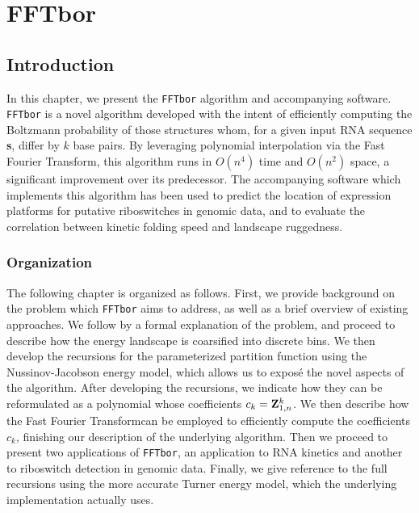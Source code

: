 
\newcommand{\FFTbor}{\mbox{\tt FFTbor}\xspace}
\newcommand{\FFT}{Fast Fourier Transform}
\newcommand{\iDFT}{inverse Discrete Fourier Transform}
\newcommand{\Z}{\mathcal{Z}}
\newcommand{\z}[3]{{\bf Z}^{#1}_{#2,#3}}
\newcommand{\seq}{{\bf s}\xspace}
\newcommand{\strS}{\ensuremath{\mathcal S}\xspace}
\newcommand{\strT}{\ensuremath{\mathcal T}\xspace}

\chapter{FFTbor}

\label{FFTbor}


\section{Introduction}

In this chapter, we present the \FFTbor algorithm and accompanying software.
\FFTbor is a novel algorithm developed with the intent of efficiently computing
the Boltzmann probability of those structures whom, for a given input RNA
sequence \seq, differ by $k$ base pairs. By leveraging polynomial interpolation
via the \FFT, this algorithm runs in $O(n^4)$ time and
$O(n^2)$ space, a significant improvement over its predecessor. The accompanying
software which implements this algorithm has been used to predict the location
of expression platforms for putative riboswitches in genomic data, and to
evaluate the correlation between kinetic folding speed and landscape ruggedness.

\subsection{Organization}

The following chapter is organized as follows. First, we provide background on
the problem which \FFTbor aims to address, as well as a brief overview of
existing approaches. We follow by a formal explanation of the problem, and
proceed to describe how the energy landscape is coarsified into discrete bins.
We then develop the recursions for the parameterized partition function using
the Nussinov-Jacobson energy model, which allows us to exposé the novel aspects
of the algorithm. After developing the recursions, we indicate how they can be
reformulated as a polynomial whose coefficients $c_k=\z{k}{1}{n}$. We then
describe how the \FFT can be employed to efficiently compute the coefficients
$c_k$, finishing our description of the underlying algorithm. Then we proceed
to present two applications of \FFTbor, an application to RNA kinetics and
another to riboswitch detection in genomic data. Finally, we give reference
to the full recursions using the more accurate Turner energy model, which the
underlying implementation actually uses.

